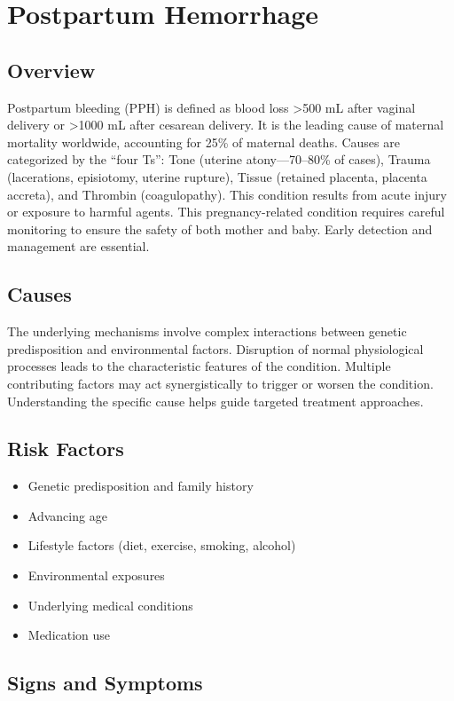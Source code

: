 \chapter{Postpartum Hemorrhage}
\label{sec:Postpartum Hemorrhage}

\section{Overview}
Postpartum bleeding (PPH) is defined as blood loss >500 mL after vaginal delivery or >1000 mL after cesarean delivery. It is the leading cause of maternal mortality worldwide, accounting for 25\% of maternal deaths. Causes are categorized by the ``four Ts'': Tone (uterine atony---70--80\% of cases), Trauma (lacerations, episiotomy, uterine rupture), Tissue (retained placenta, placenta accreta), and Thrombin (coagulopathy). This condition results from acute injury or exposure to harmful agents. This pregnancy-related condition requires careful monitoring to ensure the safety of both mother and baby. Early detection and management are essential.
\section{Causes}
The underlying mechanisms involve complex interactions between genetic predisposition and environmental factors. Disruption of normal physiological processes leads to the characteristic features of the condition. Multiple contributing factors may act synergistically to trigger or worsen the condition. Understanding the specific cause helps guide targeted treatment approaches.
\section{Risk Factors}


\begin{itemize}[noitemsep]
  \item Genetic predisposition and family history
  \item Advancing age
  \item Lifestyle factors (diet, exercise, smoking, alcohol)
  \item Environmental exposures
  \item Underlying medical conditions
  \item Medication use
\end{itemize}
\section{Signs and Symptoms}

